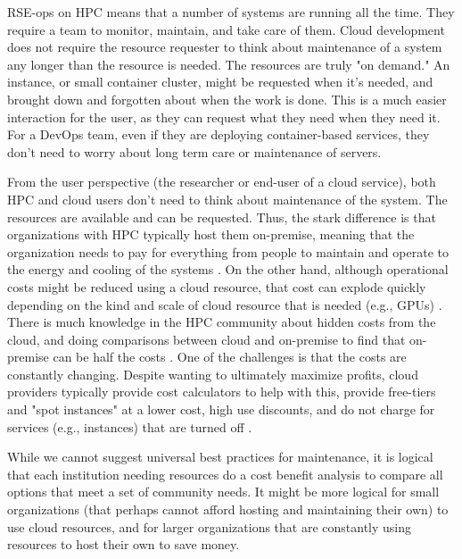 
RSE-ops on HPC means that a number of systems are running all the time. They require a team to monitor, maintain, and take care of them. Cloud development does not require the resource requester to think about maintenance of a system any longer than the resource is needed. The resources are truly "on demand." An instance, or small container cluster, might be requested when it's needed, and brought down and forgotten about when the work is done. This is a much easier interaction for the user, as they can request what they need when they need it. For a DevOps team, even if they are deploying container-based services, they don't need to worry about long term care or maintenance of servers.

From the user perspective (the researcher or end-user of a cloud service), both HPC and cloud users don't need to think about maintenance of the system. The resources are available and can be requested. Thus, the stark difference is that organizations with HPC typically host them on-premise, meaning that the organization needs to pay for everything from people to maintain and operate to the energy and cooling of the systems \cite{Carlyle2010-ga}. On the other hand, although operational costs might be reduced using a cloud resource, that cost can explode quickly depending on the kind and scale of cloud resource that is needed (e.g., GPUs) \cite{Li2020-lm}. There is much knowledge in the HPC community about hidden costs from the cloud, and doing comparisons between cloud and on-premise to find that on-premise can be half the costs \cite{Morgan2021-em, nersc-cloud-study}. One of the challenges is that the costs are constantly changing. Despite wanting to ultimately maximize profits, cloud providers typically provide cost calculators to help with this, provide free-tiers and "spot instances" at a lower cost, high use discounts, and do not charge for services (e.g., instances) that are turned off \cite{Power2018-ru}.

While we cannot suggest universal best practices for maintenance, it is logical that each institution needing resources do a cost benefit analysis to compare all options that meet a set of community needs. It might be more logical for small organizations (that perhaps cannot afford hosting and maintaining their own) to use cloud resources, and for larger organizations that are constantly using resources to host their own to save money.
